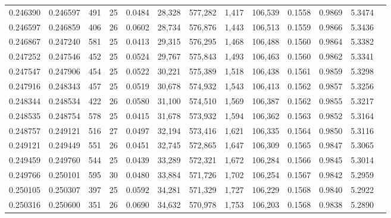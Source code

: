 \begin{tabular}{rrrrrrrrrrrrr}
0.246390 & 0.246597 & 491 &  25 &                                     0.0484 &  28,328 & 577,282 &   1,417 & 106,539 & 0.1558 & 0.9869 & 5.3474 \\
0.246597 & 0.246859 & 406 &  26 &                                     0.0602 &  28,734 & 576,876 &   1,443 & 106,513 & 0.1559 & 0.9866 & 5.3436 \\
0.246867 & 0.247240 & 581 &  25 &                                     0.0413 &  29,315 & 576,295 &   1,468 & 106,488 & 0.1560 & 0.9864 & 5.3382 \\
0.247252 & 0.247546 & 452 &  25 &                                     0.0524 &  29,767 & 575,843 &   1,493 & 106,463 & 0.1560 & 0.9862 & 5.3341 \\
0.247547 & 0.247906 & 454 &  25 &                                     0.0522 &  30,221 & 575,389 &   1,518 & 106,438 & 0.1561 & 0.9859 & 5.3298 \\
0.247916 & 0.248343 & 457 &  25 &                                     0.0519 &  30,678 & 574,932 &   1,543 & 106,413 & 0.1562 & 0.9857 & 5.3256 \\
0.248344 & 0.248534 & 422 &  26 &                                     0.0580 &  31,100 & 574,510 &   1,569 & 106,387 & 0.1562 & 0.9855 & 5.3217 \\
0.248535 & 0.248754 & 578 &  25 &                                     0.0415 &  31,678 & 573,932 &   1,594 & 106,362 & 0.1563 & 0.9852 & 5.3164 \\
0.248757 & 0.249121 & 516 &  27 &                                     0.0497 &  32,194 & 573,416 &   1,621 & 106,335 & 0.1564 & 0.9850 & 5.3116 \\
0.249121 & 0.249449 & 551 &  26 &                                     0.0451 &  32,745 & 572,865 &   1,647 & 106,309 & 0.1565 & 0.9847 & 5.3065 \\
0.249459 & 0.249760 & 544 &  25 &                                     0.0439 &  33,289 & 572,321 &   1,672 & 106,284 & 0.1566 & 0.9845 & 5.3014 \\
0.249766 & 0.250101 & 595 &  30 &                                     0.0480 &  33,884 & 571,726 &   1,702 & 106,254 & 0.1567 & 0.9842 & 5.2959 \\
0.250105 & 0.250307 & 397 &  25 &                                     0.0592 &  34,281 & 571,329 &   1,727 & 106,229 & 0.1568 & 0.9840 & 5.2922 \\
0.250316 & 0.250600 & 351 &  26 &                                     0.0690 &  34,632 & 570,978 &   1,753 & 106,203 & 0.1568 & 0.9838 & 5.2890 \\

\end{tabular}
